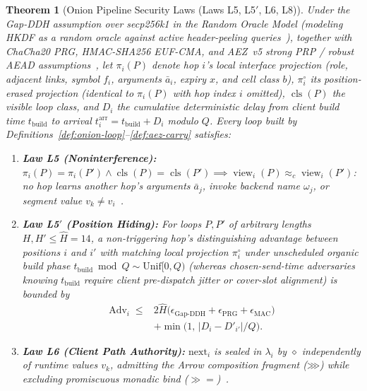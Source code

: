 \documentclass[journal]{IEEEtran}
\newtheorem{theorem}{Theorem}
\begin{document}
\begin{theorem}[Onion Pipeline Security Laws (Laws L5, L5$'$, L6, L8)]\label{theo:onion-security}
Under the Gap-DDH assumption over secp256k1 in the Random Oracle Model (modeling HKDF as a random oracle against active header-peeling queries~\cite{Danezis2009}), together with ChaCha20 PRG, HMAC-SHA256 EUF-CMA, and AEZ~v5 strong PRP / robust AEAD assumptions~\cite{Hoang2015,Degabriele2018}, let $\pi_i(P)$ denote hop $i$'s local interface projection (role, adjacent links, symbol $f_i$, arguments $\bar{a}_i$, expiry $x$, and cell class $b$), $\pi^\circ_i$ its position-erased projection (identical to $\pi_i(P)$ with hop index $i$ omitted), $\operatorname{cls}(P)$ the visible loop class, and $D_i$ the cumulative deterministic delay from client build time $t_{\mathrm{build}}$ to arrival $t^{\mathrm{arr}}_i=t_{\mathrm{build}}+D_i$ modulo $Q$. Every loop built by Definitions~\ref{def:onion-loop}--\ref{def:aez-carry} satisfies:
\begin{enumerate}[leftmargin=1.5em]
\item \textbf{Law L5 (Noninterference):} $\pi_i(P)=\pi_i(P')\land\operatorname{cls}(P)=\operatorname{cls}(P')\implies\operatorname{view}_i(P)\approx_c\operatorname{view}_i(P')$: no hop learns another hop's arguments $\bar{a}_j$, invoke backend name $\omega_j$, or segment value $v_k\neq\hat{v}_i$~\cite{Goguen1982}.
\item \textbf{Law L5$'$ (Position Hiding):} For loops $P,P'$ of arbitrary lengths $H,H'\le\hat{H}=14$, a non-triggering hop's distinguishing advantage between positions $i$ and $i'$ with matching local projection $\pi^\circ_i$ under unscheduled organic build phase $t_{\mathrm{build}}\bmod Q\sim\mathrm{Unif}[0,Q)$ (whereas chosen-send-time adversaries knowing $t_{\mathrm{build}}$ require client pre-dispatch jitter or cover-slot alignment) is bounded by
\[
\begin{aligned}
  \mathrm{Adv}_i\;\le{}&2\hat{H}\bigl(\epsilon_{\mathrm{Gap\text{-}DDH}}+\epsilon_{\mathrm{PRG}}+\epsilon_{\mathrm{MAC}}\bigr)\\
  &+\min\bigl(1,\,|D_i-D'_{i'}|/Q\bigr).
\end{aligned}
\]
\item \textbf{Law L6 (Client Path Authority):} $\mathrm{next}_i$ is sealed in $\lambda_i$ by $\diamond$ independently of runtime values $v_k$, admitting the Arrow composition fragment ($\mathbin{\ggg}$) while excluding promiscuous monadic bind ($\gg\!\!=$)~\cite{Lindley2011}.

\end{enumerate}
\end{theorem}
\end{document}
